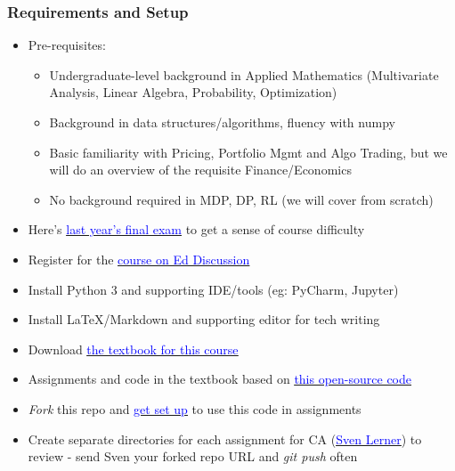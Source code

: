 \documentclass[handout]{beamer}
\begin{document}
\begin{frame}
\frametitle{Requirements and Setup}
\pause
\begin{itemize}[<+->]
\item Pre-requisites:
\begin{itemize}
\item Undergraduate-level background in Applied Mathematics (Multivariate Analysis, Linear Algebra, Probability, Optimization)
\item Background in data structures/algorithms, fluency with numpy
\item Basic familiarity with Pricing, Portfolio Mgmt and Algo Trading, but we will do an overview of the requisite Finance/Economics
\item No background required in MDP, DP, RL (we will cover from scratch)
\end{itemize}
\item Here's \href{http://web.stanford.edu/class/cme241/lecture_slides/final-2021.pdf}{\underline{\textcolor{blue}{last year's final exam}}}  to get a sense of course difficulty
\item Register for the \href{https://edstem.org/us/courses/16175}{\underline{\textcolor{blue}{course on Ed Discussion}}}
\item Install Python 3 and supporting IDE/tools (eg: PyCharm, Jupyter)
\item Install LaTeX/Markdown and supporting editor for tech writing
\item Download  \href{https://stanford.edu/~ashlearn/RLForFinanceBook/book.pdf}{\underline{\textcolor{blue}{the textbook for this course}}}
\item Assignments and code in the textbook based on \href{https://github.com/TikhonJelvis/RL-Book}{\underline{\textcolor{blue}{this open-source code}}}
\item {\em Fork} this repo and \href{http://web.stanford.edu/class/cme241/lecture_slides/assignments/assignment1.pdf}{\underline{\textcolor{blue}{get set up}}} to use this code in assignments
\item Create separate directories for each assignment for CA (\href{mailto:svenl@stanford.edu}{\underline{\textcolor{blue}{Sven Lerner}}}) to review - send Sven your forked repo URL and {\em git push} often
\end{itemize}
\end{frame}
\end{document}
